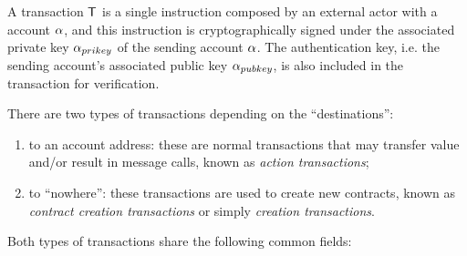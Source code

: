 A {\name} transaction $\textsf{T}$ is a single instruction composed by an external actor with a {\name} account $\mathbf{\alpha}$, and this instruction is cryptographically signed under the associated private key $\mathbf{\alpha}_{prikey}$ of the sending account $\mathbf{\alpha}$.
The authentication key, i.e. the sending account's associated public key $\mathbf{\alpha}_{pubkey}$, is also included in the transaction for verification.

There are two types of transactions depending on the ``destinations'': 
\begin{enumerate}[nosep]
	\item {to an account address:} these are normal transactions that may transfer value and/or result in message calls, known as \emph{action transactions};

	\item {to ``nowhere'':} these transactions are used to create new contracts, known as \emph{contract creation transactions} or simply \emph{creation transactions}.
\end{enumerate}
Both types of transactions share the following common fields:
